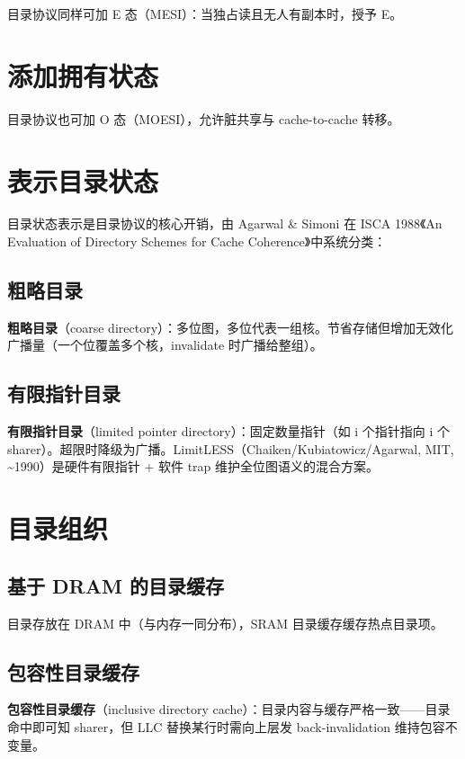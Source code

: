 目录协议同样可加 E 态（MESI）：当独占读且无人有副本时，授予 E。

\section{添加拥有状态}

目录协议也可加 O 态（MOESI），允许脏共享与 cache-to-cache 转移。

\section{表示目录状态}

目录状态表示是目录协议的核心开销，由 Agarwal \& Simoni 在 ISCA 1988《An Evaluation of Directory Schemes for Cache Coherence》中系统分类：

\subsection{粗略目录}

\textbf{粗略目录}（coarse directory）：多位图，多位代表一组核。节省存储但增加无效化广播量（一个位覆盖多个核，invalidate 时广播给整组）。

\subsection{有限指针目录}

\textbf{有限指针目录}（limited pointer directory）：固定数量指针（如 i 个指针指向 i 个 sharer）。超限时降级为广播。LimitLESS（Chaiken/Kubiatowicz/Agarwal, MIT, \textasciitilde{}1990）是硬件有限指针 + 软件 trap 维护全位图语义的混合方案。

\section{目录组织}

\subsection{基于 DRAM 的目录缓存}

目录存放在 DRAM 中（与内存一同分布），SRAM 目录缓存缓存热点目录项。

\subsection{包容性目录缓存}

\textbf{包容性目录缓存}（inclusive directory cache）：目录内容与缓存严格一致——目录命中即可知 sharer，但 LLC 替换某行时需向上层发 back-invalidation 维持包容不变量。

